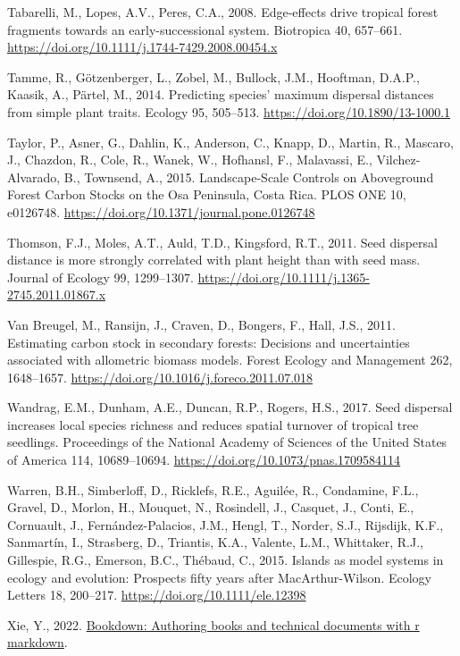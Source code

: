 \documentclass[
  12pt,
]{article}
\newlength{\cslhangindent}
\newlength{\cslentryspacingunit} %
\newenvironment{CSLReferences}[2] %
 {%
  \setlength{\parindent}{0pt}
  \ifodd #1
  \let\oldpar\par
  \def\par{\hangindent=\cslhangindent\oldpar}
  \fi
  \setlength{\parskip}{#2\cslentryspacingunit}
 }%
 {}
\begin{document}
\begin{CSLReferences}{1}{0}
\leavevmode{}%
Tabarelli, M., Lopes, A.V., Peres, C.A., 2008. Edge-effects drive tropical forest fragments towards an early-successional system. Biotropica 40, 657--661. \url{https://doi.org/10.1111/j.1744-7429.2008.00454.x}

\leavevmode{}%
Tamme, R., Götzenberger, L., Zobel, M., Bullock, J.M., Hooftman, D.A.P., Kaasik, A., Pärtel, M., 2014. Predicting species' maximum dispersal distances from simple plant traits. Ecology 95, 505--513. \url{https://doi.org/10.1890/13-1000.1}

\leavevmode{}%
Taylor, P., Asner, G., Dahlin, K., Anderson, C., Knapp, D., Martin, R., Mascaro, J., Chazdon, R., Cole, R., Wanek, W., Hofhansl, F., Malavassi, E., Vilchez-Alvarado, B., Townsend, A., 2015. Landscape-{Scale Controls} on {Aboveground Forest Carbon Stocks} on the {Osa Peninsula}, {Costa Rica}. PLOS ONE 10, e0126748. \url{https://doi.org/10.1371/journal.pone.0126748}

\leavevmode{}%
Thomson, F.J., Moles, A.T., Auld, T.D., Kingsford, R.T., 2011. Seed dispersal distance is more strongly correlated with plant height than with seed mass. Journal of Ecology 99, 1299--1307. \url{https://doi.org/10.1111/j.1365-2745.2011.01867.x}

\leavevmode{}%
Van Breugel, M., Ransijn, J., Craven, D., Bongers, F., Hall, J.S., 2011. Estimating carbon stock in secondary forests: {Decisions} and uncertainties associated with allometric biomass models. Forest Ecology and Management 262, 1648--1657. \url{https://doi.org/10.1016/j.foreco.2011.07.018}

\leavevmode{}%
Wandrag, E.M., Dunham, A.E., Duncan, R.P., Rogers, H.S., 2017. Seed dispersal increases local species richness and reduces spatial turnover of tropical tree seedlings. Proceedings of the National Academy of Sciences of the United States of America 114, 10689--10694. \url{https://doi.org/10.1073/pnas.1709584114}

\leavevmode{}%
Warren, B.H., Simberloff, D., Ricklefs, R.E., Aguilée, R., Condamine, F.L., Gravel, D., Morlon, H., Mouquet, N., Rosindell, J., Casquet, J., Conti, E., Cornuault, J., Fernández-Palacios, J.M., Hengl, T., Norder, S.J., Rijsdijk, K.F., Sanmartín, I., Strasberg, D., Triantis, K.A., Valente, L.M., Whittaker, R.J., Gillespie, R.G., Emerson, B.C., Thébaud, C., 2015. Islands as model systems in ecology and evolution: Prospects fifty years after {MacArthur-Wilson}. Ecology Letters 18, 200--217. \url{https://doi.org/10.1111/ele.12398}

\leavevmode{}%
Xie, Y., 2022. \href{https://github.com/rstudio/bookdown}{Bookdown: Authoring books and technical documents with r markdown}.

\end{CSLReferences}
\end{document}
